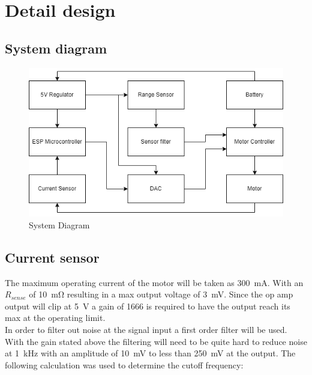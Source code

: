 \chapter{Detail design}\label{ch:detail_design}
\section{System diagram}
\begin{figure}[H]
\centering
\includegraphics[width=0.9\linewidth]{./Figures/SystemDiagram.png}
\caption{System Diagram}
\label{fig:systdiag}
\end{figure}

\clearpage
\section{Current sensor}\label{sec:current_sensor_design}
The maximum operating current of the motor will be taken as \SI{300}{\milli\ampere}. With an $R_{sense}$ of \SI{10}{\milli\ohm} resulting in a max output voltage of \SI{3}{\milli\volt}. Since the op amp output will clip at \SI{5}{\volt} a gain of 1666 is required to have the output reach its max at the operating limit.\\

In order to filter out noise at the signal input a first order filter will be used. With the gain stated above the filtering will need to be quite hard to reduce noise at \SI{1}{\kilo\hertz} with an amplitude of \SI{10}{\milli\volt} to less than \SI{250}{\milli\volt} at the output. The following calculation was used to determine the cutoff frequency: 

